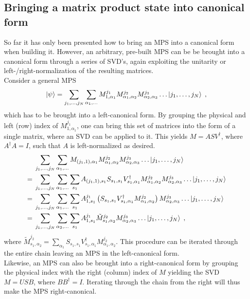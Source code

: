 \subsection{Bringing a matrix product state into canonical form}
So far it has only been presented how to bring an MPS into a canonical form when building it. However, an arbitrary, pre-built MPS can be be brought into a canonical form through a series of SVD's, again exploiting the unitarity or left-/right-normalization of the resulting matrices.\\
Consider a general MPS
\begin{equation}
	\ket{\psi} = \sum_{j_1 , \ldots , j_N} \sum_{\alpha_1 , \ldots } M_{1 , \alpha_1}^{j_1} M_{\alpha_1 , \alpha_2}^{j_2} M_{\alpha_2 , \alpha_3}^{j_3} \ldots \ket{j_1 , \ldots , j_N} \; , 
\end{equation}
which has to be brought into a left-canonical form. By grouping the physical and left (row) index of $M_{1 , \alpha_1}^{j_1}$, one can bring this set of matrices into the form of a single matrix, where an SVD can be applied to it. This yields $M = A S V^{\dag}$, where $A^{\dag} A = I$, such that $A$ is left-normalized as desired.
\begin{align}
& \; \sum_{j_1 , \ldots , j_N} \sum_{\alpha_1 , \ldots } M_{(j_1 , 1) , \alpha_1} M_{\alpha_1 , \alpha_2}^{j_2} M_{\alpha_2 , \alpha_3}^{j_3} \ldots \ket{j_1 , \ldots , j_N} \nonumber \\
= & \; \sum_{j_1 , \ldots , j_N} \sum_{\alpha_1 , \ldots } \sum_{s_1} A_{(j_1 , 1) , s_1} S_{s_1 , s_1} V_{s_1 , \alpha_1}^{\dag} M_{\alpha_1 , \alpha_2}^{j_2} M_{\alpha_2 , \alpha_3}^{j_3} \ldots \ket{j_1 , \ldots , j_N} \nonumber \\
= & \; \sum_{j_1 , \ldots , j_N} \sum_{\alpha_1 , \ldots } \sum_{s_1} A_{1 , s_1}^{j_1} \left( S_{s_1 , s_1} V_{s_1 , \alpha_1}^{\dag} M_{\alpha_1 , \alpha_2}^{j_2} \right) M_{\alpha_2 , \alpha_3}^{j_3} \ldots \ket{j_1 , \ldots , j_N} \nonumber \\
= & \; \sum_{j_1 , \ldots , j_N} \sum_{\alpha_2 , \ldots } \sum_{s_1} A_{1 , s_1}^{j_1} \tilde{M}_{s_1 , \alpha_2}^{j_2} M_{\alpha_2 , \alpha_3}^{j_3} \ldots \ket{j_1 , \ldots , j_N} \; ,
\end{align}
where $\tilde{M}_{s_1 , \alpha_2}^{j_2} = \sum_{\alpha_1} S_{s_1 , s_1} V_{s_1 , \alpha_1}^{\dag} M_{\alpha_1 , \alpha_2}^{j_2}$. This procedure can be iterated through the entire chain leaving an MPS in the left-canonical form.\\
Likewise, an MPS can also be brought into a right-canonical form by grouping the physical index with the right (column) index of $M$ yielding the SVD $M = U S B$, where $B B^{\dag} = I$. Iterating through the chain from the right will thus make the MPS right-canonical. \cite{Schollwock}

